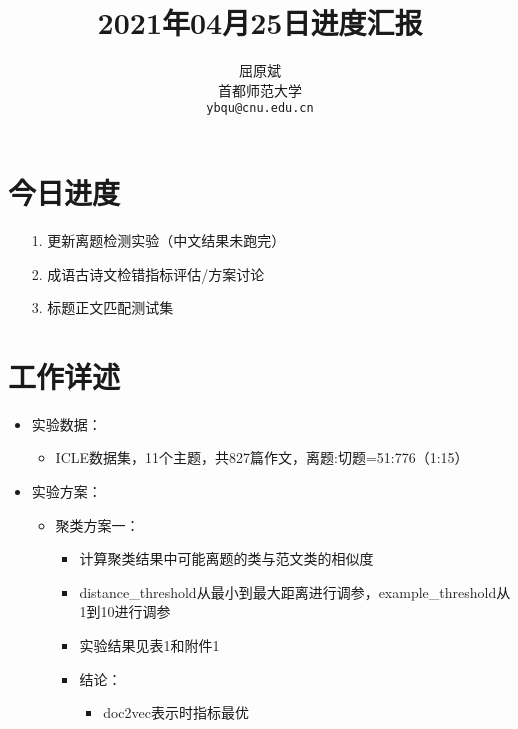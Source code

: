 \documentclass[11pt]{article}
\title{2021年04月25日进度汇报}
\author{屈原斌 \\
  首都师范大学 \\
    {\tt ybqu@cnu.edu.cn}}
\date{}
\begin{document}
\begin{CJK}{UTF8}{gkai}

\maketitle
\CJKindent


\section{今日进度}


\begin{itemize}
  \item [1.] 更新离题检测实验（中文结果未跑完）
  \item [2.] 成语古诗文检错指标评估/方案讨论
  \item [3.] 标题正文匹配测试集
\end{itemize}

\section{工作详述}
\begin{itemize}
  \item 实验数据：
  \begin{itemize}
    \item ICLE数据集，11个主题，共827篇作文，离题:切题=51:776（1:15）
  \end{itemize}
  \item 实验方案：
  \begin{itemize}
    \item 聚类方案一：
    \begin{itemize}
      \item 计算聚类结果中可能离题的类与范文类的相似度
      \item distance\_threshold从最小到最大距离进行调参，example\_threshold从1到10进行调参
      \item 实验结果见表1和附件1
      \item 结论：
      \begin{itemize}
        \item doc2vec表示时指标最优
      \end{itemize}
    \end{itemize}
    
  \end{itemize}
\end{itemize}


\end{CJK}
\end{document}
